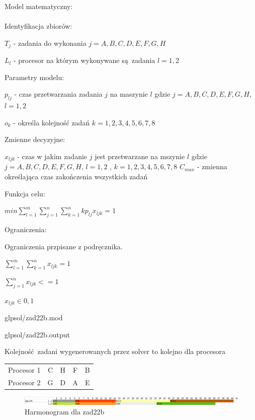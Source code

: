 \documentclass{article}
\begin{document}
\noindent Model matematyczny: \\\\

\noindent Identyfikacja zbiorów:

$T_j$ - zadania do wykonania $j = {A,B,C,D,E,F,G,H}$

$L_{l}$ - procesor na którym wykonywane są zadania $l = {1,2}$

\noindent Parametry modelu:

$p_{lj}$ - czas przetwarzania zadania $j$ na maszynie $l$ gdzie $j = {A,B,C,D,E,F,G,H}$, $l = {1,2}$

$o_k$  - określa kolejność zadań $k = {1,2,3,4,5,6,7,8}$

\noindent Zmienne decyzyjne:

$x_{ljk}$ - czas w jakim zadanie $j$ jest przetwarzane na mszynie $l$ gdzie $j = {A,B,C,D,E,F,G,H}$, $l = {1,2}$ , $k = {1,2,3,4,5,6,7,8}$
$C_{max}$ - zmienna określająca czas zakończenia wszystkich zadań

\noindent Funkcja celu:

$min \sum^{m}_{l=1}\sum^{n}_{j=1}\sum^{n}_{k=1} k p_{lj} x_{ljk} = 1$ 

\noindent Ograniczenia:

Ograniczenia przpisane z podręcznika.

$\sum^{m}_{l=1} \sum^{n}_{k=1} x_{ljk} = 1$

$\sum^{n}_{j=1} x_{ljk} <= 1$

$x_{ljk} \in {0,1}$



{glpsol/zad22b.mod}


{glpsol/zad22b.output}

Kolejność zadani wygenerowanych przez solver to kolejno dla procesora

\begin{table}[H]
	\centering
	\begin{tabular}{| c | c | c | c | c |}
		Procesor 1 & C & H & F & B \\
		Procesor 2 & G & D & A & E \\
	\end{tabular}
\end{table}


\begin{figure}[h]    
  \centering 
  \includegraphics[width=\linewidth]{others/zad22b_harmonogram.png}
  \caption{Harmonogram dla zad22b}
\end{figure}
\end{document}
